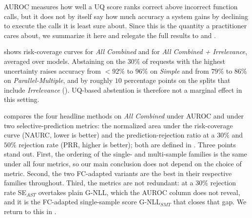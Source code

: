 AUROC measures how well a UQ score ranks correct above incorrect function calls, but it does not by itself say how much accuracy a system gains by declining to execute the calls it is least sure about. Since this is the quantity a practitioner cares about, we summarize it here and relegate the full results to  and .

 shows risk-coverage curves for \emph{All Combined} and for \emph{All Combined + Irrelevance}, averaged over models. Abstaining on the $30\%$ of requests with the highest uncertainty raises accuracy from ${<}92\%$ to $96\%$ on \emph{Simple} and from $79\%$ to $86\%$ on \emph{Parallel-Multiple}, and by roughly $10$ percentage points on the splits that include \emph{Irrelevance} (). UQ-based abstention is therefore not a marginal effect in this setting.

 compares the four headline methods on \emph{All Combined} under AUROC and under two selective-prediction metrics: the normalized area under the risk-coverage curve (NAURC, lower is better) and the prediction-rejection ratio at a $30\%$ and $50\%$ rejection rate (PRR, higher is better); both are defined in . Three points stand out. First, the ordering of the single- and multi-sample families is the same under all four metrics, so our main conclusion does not depend on the choice of metric. Second, the two FC-adapted variants are the best in their respective families throughout. Third, the metrics are not redundant: at a $30\%$ rejection rate SE$_{AST}$ overtakes plain G-NLL, which the AUROC column does not reveal, and it is the FC-adapted single-sample score G-NLL$_{SMT}$ that closes that gap. We return to this in .

\begin{table}[h!]
\centering
{}
\caption{The two best single-sample and two best multi-sample methods on \emph{All Combined}, under AUROC and the selective-prediction metrics of  (mean over eight LLMs). Arrows indicate the direction of improvement; best result in . Per-split results for all methods are in  and .}
\label{tab:selective_main}
\end{table}

